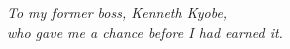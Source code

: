 \begin{center}
\vspace*{3cm}
\textit{To my former boss, Kenneth Kyobe,\\
who gave me a chance before I had earned it.}
\end{center}
